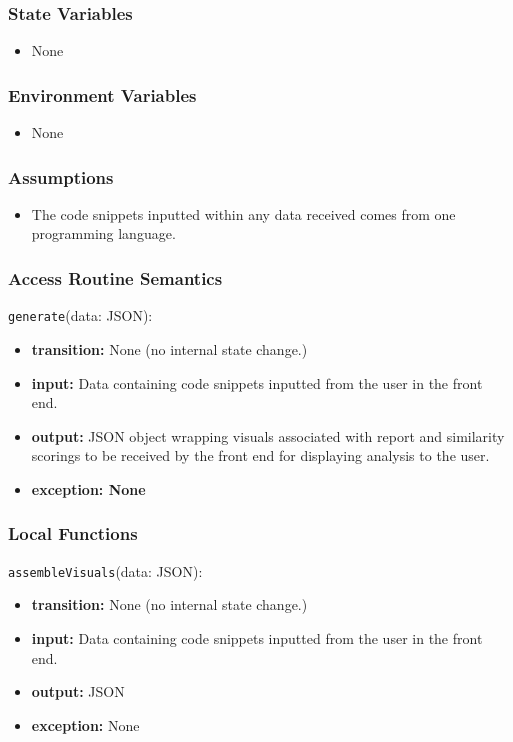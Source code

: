 \documentclass[12pt, titlepage]{article}
\begin{document}
\begin{itemize}
\subsubsection{State Variables}

\begin{itemize}
    \item None
\end{itemize}

\subsubsection{Environment Variables}

\begin{itemize}
  \item None
\end{itemize}

\subsubsection{Assumptions}

\begin{itemize}
    \item The code snippets inputted within any data received comes from one programming language.
\end{itemize}

\subsubsection{Access Routine Semantics}
\noindent \texttt{generate}(data: JSON):
\begin{itemize}
    \item \textbf{transition:} None (no internal state change.)
    \item \textbf{input:} Data containing code snippets inputted from the user in the front end.
    \item \textbf{output:} JSON object wrapping visuals associated with report and 
    similarity scorings to be received by the front end for displaying analysis to the user.
    \item \textbf{exception: None}
\end{itemize}

\subsubsection{Local Functions}
 \noindent \texttt{assembleVisuals}(data: JSON):
\begin{itemize}
    \item \textbf{transition:} None (no internal state change.)
    \item \textbf{input:} Data containing code snippets inputted from the user in the front end.
    \item \textbf{output:} JSON
    \item \textbf{exception:} None
\end{itemize}



\end{itemize}
\end{document}
